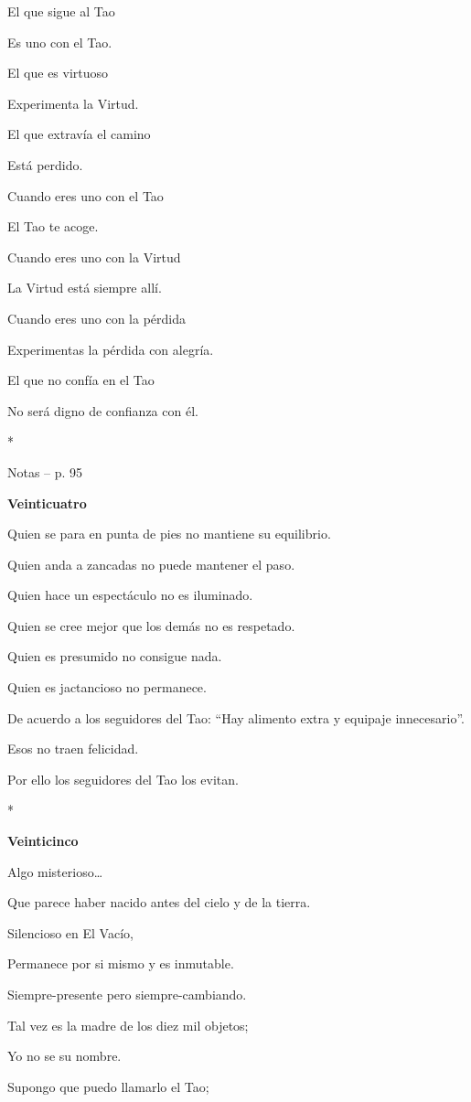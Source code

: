 El que sigue al Tao

Es uno con el Tao.

El que es virtuoso

Experimenta la Virtud.

El que extravía el camino

Está perdido.

Cuando eres uno con el Tao

El Tao te acoge.

Cuando eres uno con la Virtud

La Virtud está siempre allí.

Cuando eres uno con la pérdida

Experimentas la pérdida con alegría.

El que no confía en el Tao

No será digno de confianza con él.

*

Notas -- p. 95

\textbf{Veinticuatro}

Quien se para en punta de pies no mantiene su equilibrio.

Quien anda a zancadas no puede mantener el paso.

Quien hace un espectáculo no es iluminado.

Quien se cree mejor que los demás no es respetado.

Quien es presumido no consigue nada.

Quien es jactancioso no permanece.

De acuerdo a los seguidores del Tao: ``Hay alimento extra y equipaje
innecesario''.

Esos no traen felicidad.

Por ello los seguidores del Tao los evitan.

*

\textbf{Veinticinco}

Algo misterioso\ldots{}

Que parece haber nacido antes del cielo y de la tierra.

Silencioso en El Vacío,

Permanece por si mismo y es inmutable.

Siempre-presente pero siempre-cambiando.

Tal vez es la madre de los diez mil objetos;

Yo no se su nombre.

Supongo que puedo llamarlo el Tao;

